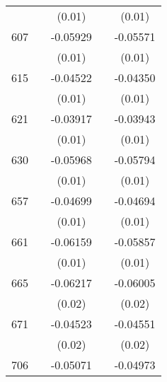 \begin{table}[htbp]
\begin{tabular}{l*{4}{c}}
                    &                     &      (0.01)         &                     &      (0.01)         \\
607                 &                     &    -0.05929\sym{***}&                     &    -0.05571\sym{***}\\
                    &                     &      (0.01)         &                     &      (0.01)         \\
615                 &                     &    -0.04522\sym{***}&                     &    -0.04350\sym{***}\\
                    &                     &      (0.01)         &                     &      (0.01)         \\
621                 &                     &    -0.03917\sym{***}&                     &    -0.03943\sym{***}\\
                    &                     &      (0.01)         &                     &      (0.01)         \\
630                 &                     &    -0.05968\sym{***}&                     &    -0.05794\sym{***}\\
                    &                     &      (0.01)         &                     &      (0.01)         \\
657                 &                     &    -0.04699\sym{***}&                     &    -0.04694\sym{***}\\
                    &                     &      (0.01)         &                     &      (0.01)         \\
661                 &                     &    -0.06159\sym{***}&                     &    -0.05857\sym{***}\\
                    &                     &      (0.01)         &                     &      (0.01)         \\
665                 &                     &    -0.06217\sym{**} &                     &    -0.06005\sym{**} \\
                    &                     &      (0.02)         &                     &      (0.02)         \\
671                 &                     &    -0.04523\sym{*}  &                     &    -0.04551\sym{*}  \\
                    &                     &      (0.02)         &                     &      (0.02)         \\
706                 &                     &    -0.05071\sym{***}&                     &    -0.04973\sym{***}\\

\end{tabular}
\end{table}
